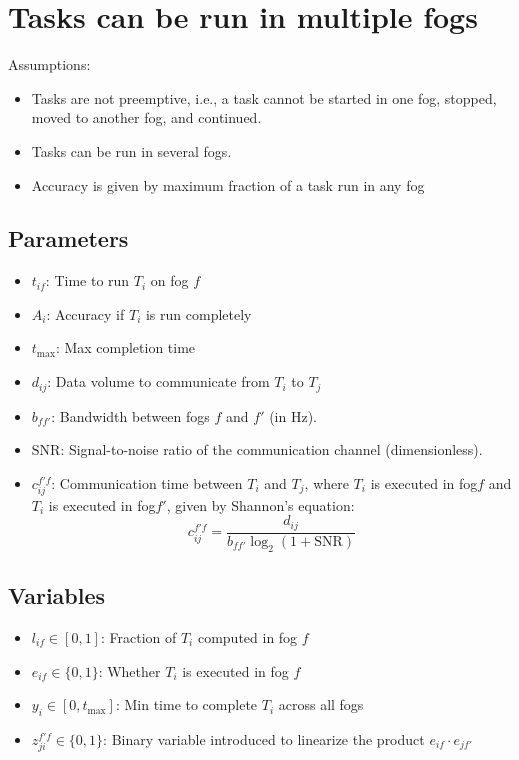 \documentclass{article}
\begin{document}
\section{Tasks can be run in multiple fogs}
Assumptions: 
\begin{itemize}
    \item Tasks are not preemptive, i.e., a task cannot be started in one fog, stopped, moved to another fog, and continued.
    \item Tasks can be run in several fogs.
    \item Accuracy is given by maximum fraction of a task run in any fog 
\end{itemize}

\subsection*{Parameters}
\begin{itemize}
    \item $t_{if}$: Time to run $T_i$ on fog $f$
    \item $A_i$: Accuracy if $T_i$ is run completely
    \item $t_{\max}$: Max completion time
    \item $d_{ij}$: Data volume to communicate from $T_i$ to $T_j$
    \item \( b_{ff'} \): Bandwidth between fogs \( f \) and \( f' \) (in Hz).
    \item \( \text{SNR} \): Signal-to-noise ratio of the communication channel (dimensionless).
    \item \( c_{ij}^{f'f} \): Communication time between \( T_i \) and \( T_j \), where \(T_i\) is executed in fog\( f \) and \(T_i\) is executed in fog\( f' \), given by Shannon's equation: 
    \[
    c_{ij}^{f'f} = \frac{d_{ij}}{b_{ff'} \log_2(1 + \text{SNR})}
    \]
\end{itemize}
\subsection*{Variables}
\begin{itemize}
    \item $l_{if} \in [0,1]$: Fraction of $T_{i}$ computed in fog $f$
    \item $e_{if} \in \{0,1\}$: Whether $T_{i}$ is executed in fog $f$
    \item $y_{i} \in [0,t_{\max}]$: Min time to complete $T_i$ across all fogs
    \item $z_{ji}^{f'f}\in \{0,1\}$: Binary variable introduced to linearize the product \( e_{if} \cdot e_{jf'} \)
\end{itemize}
\end{document}
